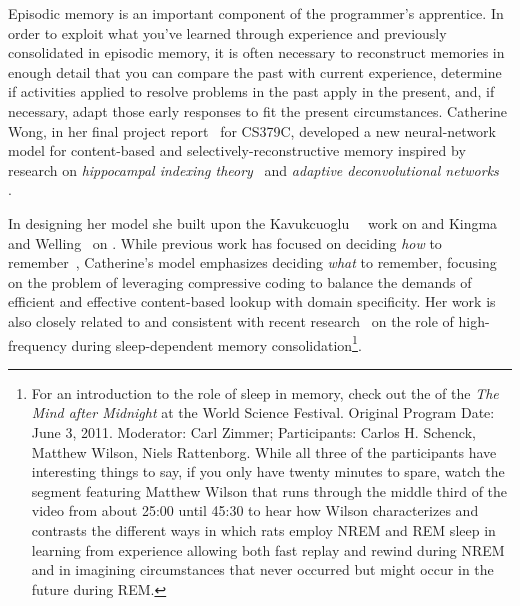 
Episodic memory is an important component of the programmer's apprentice. In order to exploit what you've learned through experience and previously consolidated in episodic memory, it is often necessary to reconstruct memories in enough detail that you can compare the past with current experience, determine if activities applied to resolve problems in the past apply in the present, and, if necessary, adapt those early responses to fit the present circumstances. Catherine Wong, in her final project report~\cite{CS379C_Final_Project_Wong-18} for CS379C, developed a new neural-network model for content-based and selectively-reconstructive memory inspired by research on {\it{hippocampal indexing theory}}~\cite{TeylerandRudyHIPPOCAMPUS-07} and {\it{adaptive deconvolutional networks}}~\cite{ZeileretalICCV-11,ZeileretalCVPR-10} {}. 

In designing her model she built upon the Kavukcuoglu~\etal{}~\cite{KavukcuogluetalNIPS-10} work on {} and Kingma and Welling~\cite{KingmaandWellingCoRR-13} on {}. While previous work has focused on deciding {\it{how}} to remember~\cite{WayneetalCoRR-18}, Catherine's model emphasizes deciding {\it{what}} to remember, focusing on the problem of leveraging compressive coding to balance the demands of efficient and effective content-based lookup with domain specificity. Her work is also closely related to and consistent with recent research~\cite{LatchoumaneetalNEURON-17,FanetalJCN-17,NielsenNLM-15} on the role of high-frequency {} during sleep-dependent memory consolidation\footnote{%
%
  For an introduction to the role of sleep in memory, check out the {} of the {\it{The Mind after Midnight}} at the World Science Festival. Original Program Date: June 3, 2011. Moderator: Carl Zimmer; Participants: Carlos H. Schenck, Matthew Wilson, Niels Rattenborg. While all three of the participants have interesting things to say, if you only have twenty minutes to spare, watch the segment featuring Matthew Wilson that runs through the middle third of the video from about 25:00 until 45:30 to hear how Wilson characterizes and contrasts the different ways in which rats employ NREM and REM sleep in learning from experience \emdash{} allowing both fast replay and rewind during NREM and in imagining circumstances that never occurred but might occur in the future during REM.}.

